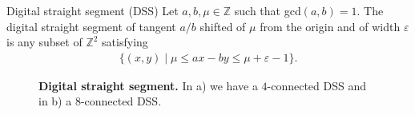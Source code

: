 \begin{definition}{Digital straight segment (DSS)}
Let $a,b,\mu \in \mathbb{Z}$ such that gcd$(a,b)=1$. The digital straight segment of tangent $a/b$ shifted of $\mu$ from the origin and of width $\varepsilon$ is any subset of $\mathbb{Z}^2$ satisfying~
\begin{align*}
	\{ (x,y) \; | \; \mu \leq ax - by \leq \mu + \varepsilon - 1 \}.
\end{align*}
\end{definition}
\begin{figure}
\center
{}
\caption{\textbf{Digital straight segment.} In a) we have a $4$-connected DSS and in b) a $8$-connected DSS.}
\label{ch4:fig:dss}
\end{figure}

